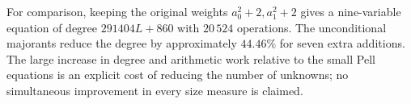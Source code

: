 For comparison, keeping the original weights $a_0^2+2,a_1^2+2$
gives a nine-variable equation of degree $291404L+860$ with
$20\,524$ operations.  The unconditional majorants reduce the
degree by approximately $44.46\%$ for seven extra additions.
The large increase in degree and arithmetic work relative to the
small Pell equations is an explicit cost of reducing the number of
unknowns; no simultaneous improvement in every size measure is claimed.
